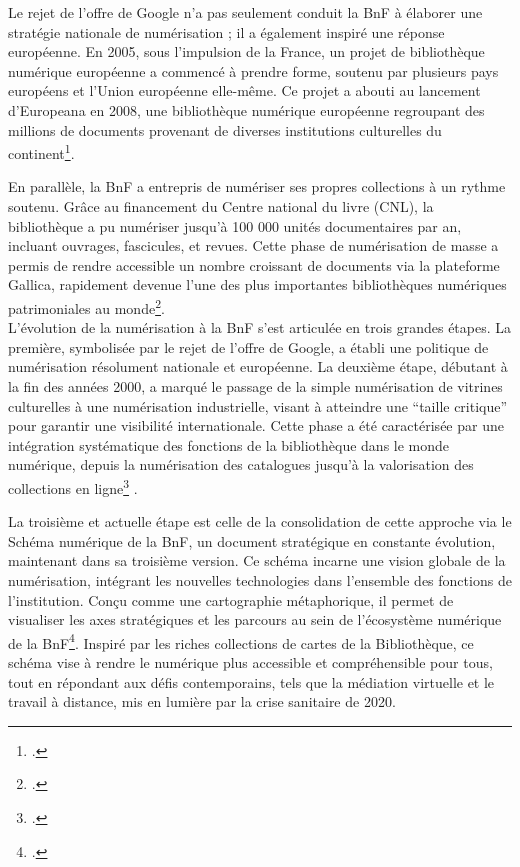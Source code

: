 \documentclass[a4paper,12pt,twoside]{book}
\begin{document}
	Le rejet de l’offre de Google n’a pas seulement conduit la BnF à élaborer une stratégie nationale de numérisation ; il a également inspiré une réponse européenne. En 2005, sous l’impulsion de la France, un projet de bibliothèque numérique européenne a commencé à prendre forme, soutenu par plusieurs pays européens et l’Union européenne elle-même. Ce projet a abouti au lancement d’Europeana en 2008, une bibliothèque numérique européenne regroupant des millions de documents provenant de diverses institutions culturelles du continent\footcite{bruckmann_numerisation_2012}.
	
	En parallèle, la BnF a entrepris de numériser ses propres collections à un rythme soutenu. Grâce au financement du Centre national du livre (CNL), la bibliothèque a pu numériser jusqu’à 100 000 unités documentaires par an, incluant ouvrages, fascicules, et revues. Cette phase de numérisation de masse a permis de rendre accessible un nombre croissant de documents via la plateforme Gallica, rapidement devenue l’une des plus importantes bibliothèques numériques patrimoniales au monde\footcite{bruckmann_numerisation_2012}.
	\\
	
	L’évolution de la numérisation à la BnF s’est articulée en trois grandes étapes. La première, symbolisée par le rejet de l’offre de Google, a établi une politique de numérisation résolument nationale et européenne. La deuxième étape, débutant à la fin des années 2000, a marqué le passage de la simple numérisation de vitrines culturelles à une numérisation industrielle, visant à atteindre une “taille critique” pour garantir une visibilité internationale. Cette phase a été caractérisée par une intégration systématique des fonctions de la bibliothèque dans le monde numérique, depuis la numérisation des catalogues jusqu’à la valorisation des collections en ligne\footcite{engel_numerique_2022} .
	
	La troisième et actuelle étape est celle de la consolidation de cette approche via le Schéma numérique de la BnF, un document stratégique en constante évolution, maintenant dans sa troisième version. Ce schéma incarne une vision globale de la numérisation, intégrant les nouvelles technologies dans l’ensemble des fonctions de l’institution.  Conçu comme une cartographie métaphorique, il permet de visualiser les axes stratégiques et les parcours au sein de l’écosystème numérique de la BnF\footcite{racine_schema_2009}. Inspiré par les riches collections de cartes de la Bibliothèque, ce schéma vise à rendre le numérique plus accessible et compréhensible pour tous, tout en répondant aux défis contemporains, tels que la médiation virtuelle et le travail à distance, mis en lumière par la crise sanitaire de 2020. 
	
\end{document}
